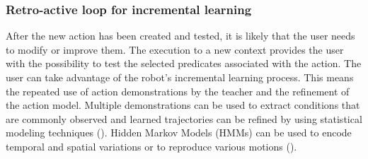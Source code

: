 \subsubsection{Retro-active loop for incremental learning}
After the new action has been created and tested, it is likely that the user needs to modify or improve them.
The execution to a new context provides the user with the possibility to test the selected predicates associated with the action.
The user can take advantage of the robot's incremental learning process.
This means the repeated use of action demonstrations by the teacher and the refinement of the action model.
Multiple demonstrations can be used to extract conditions that are commonly observed and learned trajectories can be refined by using statistical modeling techniques (\cite{ude1993trajectory}).
Hidden Markov Models (HMMs) can be used to encode temporal and spatial variations or to reproduce various motions (\cite{tso1996hidden}).

